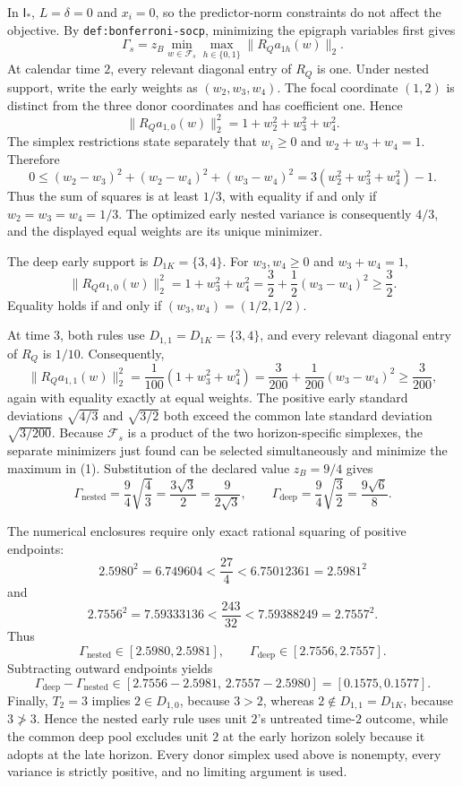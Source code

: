 In \(\mathsf I_*\), \(L=\delta=0\) and \(x_i=0\), so the predictor-norm
constraints do not affect the objective.  By
\texttt{def:bonferroni-socp}, minimizing the epigraph variables first gives
\[
 \Gamma_s=z_B\min_{w\in\mathcal F_s}
 \max_{h\in\{0,1\}}\lVert R_Qa_{1h}(w)\rVert_2. \tag{1}
\]
At calendar time \(2\), every relevant diagonal entry of \(R_Q\) is one.
Under nested support, write the early weights as
\((w_2,w_3,w_4)\).  The focal coordinate \((1,2)\) is distinct from the
three donor coordinates and has coefficient one.  Hence
\[
 \lVert R_Qa_{1,0}(w)\rVert_2^2
 =1+w_2^2+w_3^2+w_4^2. \tag{2}
\]
The simplex restrictions state separately that \(w_i\geq0\) and
\(w_2+w_3+w_4=1\).  Therefore
\[
 0\leq (w_2-w_3)^2+(w_2-w_4)^2+(w_3-w_4)^2
 =3(w_2^2+w_3^2+w_4^2)-1. \tag{3}
\]
Thus the sum of squares is at least \(1/3\), with equality if and only if
\(w_2=w_3=w_4=1/3\).  The optimized early nested variance is consequently
\(4/3\), and the displayed equal weights are its unique minimizer.

The deep early support is \(D_{1K}=\{3,4\}\).  For
\(w_3,w_4\geq0\) and \(w_3+w_4=1\),
\[
 \lVert R_Qa_{1,0}(w)\rVert_2^2
 =1+w_3^2+w_4^2
 =\frac32+\frac12(w_3-w_4)^2\geq\frac32. \tag{4}
\]
Equality holds if and only if \((w_3,w_4)=(1/2,1/2)\).

At time \(3\), both rules use \(D_{1,1}=D_{1K}=\{3,4\}\), and every
relevant diagonal entry of \(R_Q\) is \(1/10\).  Consequently,
\[
 \lVert R_Qa_{1,1}(w)\rVert_2^2
 =\frac1{100}(1+w_3^2+w_4^2)
 =\frac3{200}+\frac1{200}(w_3-w_4)^2
 \geq\frac3{200}, \tag{5}
\]
again with equality exactly at equal weights.  The positive early standard
deviations \(\sqrt{4/3}\) and \(\sqrt{3/2}\) both exceed the common late
standard deviation \(\sqrt{3/200}\).  Because \(\mathcal F_s\) is a product
of the two horizon-specific simplexes, the separate minimizers just found can
be selected simultaneously and minimize the maximum in (1).  Substitution of
the declared value \(z_B=9/4\) gives
\[
 \Gamma_{\mathrm{nested}}
 =\frac94\sqrt{\frac43}
 =\frac{3\sqrt3}{2}
 =\frac9{2\sqrt3},
 \qquad
 \Gamma_{\mathrm{deep}}
 =\frac94\sqrt{\frac32}
 =\frac{9\sqrt6}{8}. \tag{6}
\]

The numerical enclosures require only exact rational squaring of positive
endpoints:
\[
 2.5980^2=6.749604<\frac{27}{4}<6.75012361=2.5981^2
\]
and
\[
 2.7556^2=7.59333136<\frac{243}{32}<7.59388249=2.7557^2.
\]
Thus
\[
 \Gamma_{\mathrm{nested}}\in[2.5980,2.5981],
 \qquad
 \Gamma_{\mathrm{deep}}\in[2.7556,2.7557].
\]
Subtracting outward endpoints yields
\[
 \Gamma_{\mathrm{deep}}-\Gamma_{\mathrm{nested}}
 \in[2.7556-2.5981,\,2.7557-2.5980]
 =[0.1575,0.1577]. \tag{7}
\]
Finally, \(T_2=3\) implies \(2\in D_{1,0}\), because \(3>2\), whereas
\(2\notin D_{1,1}=D_{1K}\), because \(3\not>3\).  Hence the nested early
rule uses unit \(2\)'s untreated time-\(2\) outcome, while the common deep
pool excludes unit \(2\) at the early horizon solely because it adopts at the
late horizon.  Every donor simplex used above is nonempty, every variance is
strictly positive, and no limiting argument is used.


